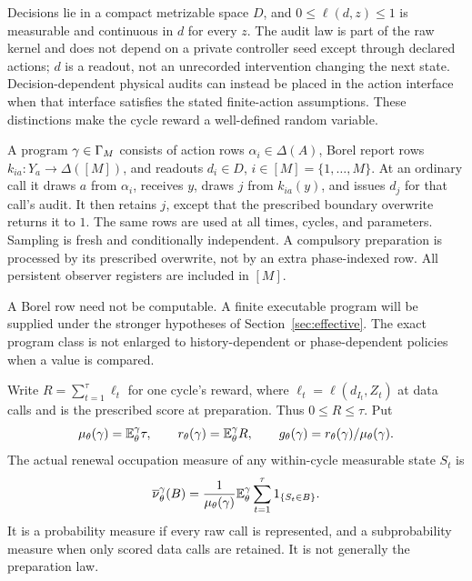 Decisions lie in a compact metrizable space $D$, and $0\le\ell(d,z)\le1$ is measurable and continuous in $d$ for every $z$. The audit law is part of the raw kernel and does not depend on a private controller seed except through declared actions; $d$ is a readout, not an unrecorded intervention changing the next state. Decision-dependent physical audits can instead be placed in the action interface when that interface satisfies the stated finite-action assumptions. These distinctions make the cycle reward a well-defined random variable.

\begin{definition}\label{def:program}
A program $\gamma\in\Gamma_M$ consists of action rows $\alpha_i\in\Delta(A)$, Borel report rows $k_{ia}:Y_a\to\Delta([M])$, and readouts $d_i\in D$, $i\in[M]=\{1,\ldots,M\}$. At an ordinary call it draws $a$ from $\alpha_i$, receives $y$, draws $j$ from $k_{ia}(y)$, and issues $d_j$ for that call's audit. It then retains $j$, except that the prescribed boundary overwrite returns it to $1$. The same rows are used at all times, cycles, and parameters. Sampling is fresh and conditionally independent. A compulsory preparation is processed by its prescribed overwrite, not by an extra phase-indexed row. All persistent observer registers are included in $[M]$.
\end{definition}
A Borel row need not be computable. A finite executable program will be supplied under the stronger hypotheses of Section~\ref{sec:effective}. The exact program class is not enlarged to history-dependent or phase-dependent policies when a value is compared.

Write $R=\sum_{t=1}^{\tau}\ell_t$ for one cycle's reward, where $\ell_t=\ell(d_{I_t},Z_t)$ at data calls and is the prescribed score at preparation. Thus $0\le R\le\tau$. Put
\begin{equation}\label{eq:cycle}
 \mu_\theta(\gamma)=\mathbb E_\theta^\gamma\tau,\qquad
 r_\theta(\gamma)=\mathbb E_\theta^\gamma R,\qquad
 g_\theta(\gamma)=r_\theta(\gamma)/\mu_\theta(\gamma).
\end{equation}
The actual renewal occupation measure of any within-cycle measurable state $S_t$ is
\begin{equation}\label{eq:occupation}
 \overline\nu_\theta^\gamma(B)
 =\frac1{\mu_\theta(\gamma)}\mathbb E_\theta^\gamma
       \sum_{t=1}^{\tau}1_{\{S_t\in B\}}.
\end{equation}
It is a probability measure if every raw call is represented, and a subprobability measure when only scored data calls are retained. It is not generally the preparation law.


